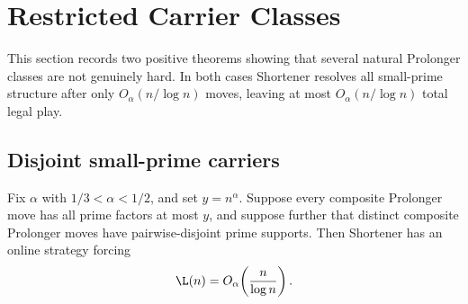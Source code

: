 
\section{Restricted Carrier Classes}\label{sec:restricted-class}

This section records two positive theorems showing that several natural
Prolonger classes are not genuinely hard.  In both cases Shortener resolves all
small-prime structure after only $O_\alpha(n/\log n)$ moves, leaving at most
$O_\alpha(n/\log n)$ total legal play.

\subsection{Disjoint small-prime carriers}

\begin{theorem}[Theorem 5]\label{thm:theorem5}
Fix $\alpha$ with $1/3<\alpha<1/2$, and set $y=n^\alpha$.  Suppose every
composite Prolonger move has all prime factors at most $y$, and suppose further
that distinct composite Prolonger moves have pairwise-disjoint prime supports.
Then Shortener has an online strategy forcing
\[
  \L(n)=O_\alpha\!\left(\frac{n}{\log n}\right).
\]
\end{theorem}

